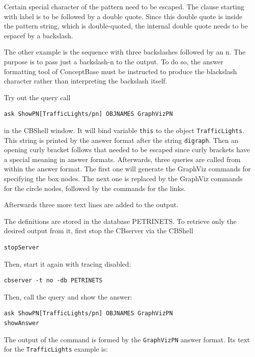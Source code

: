 \documentclass[10pt,a4paper]{article}
\begin{document}
Certain special character of the pattern need to be escaped. The clause starting with label 
is to be followed by a double quote. Since this double quote is inside the pattern string, which
is double-quoted, the internal double quote needs to be espacef by a backslash.

The other example is the sequence with three backslashes followed by an n. The purpose is
to pass just a backslash-n to the output. To do so, the answer formatting tool of ConceptBase
must be instructed to produce the blackslash character rather than interpreting the backslash itself.


Try out the query call

\begin{verbatim}
ask ShowPN[TrafficLights/pn] OBJNAMES GraphVizPN
\end{verbatim}

in the CBShell window. It will bind variable {\tt this} to the object {\tt TrafficLights}.
This string is printed by the answer format after the string {\tt digraph}.
Then an opening curly bracket follows that needed to be escaped
since curly brackets have a special meaning in answer formats.
Afterwards, three queries are called from within the answer format. The first one will
generate the GraphViz commands for specifying the box nodes. The next one is replaced by the
GraphViz commands for the circle nodes, followed by the commands for the links.

Afterwards three more text lines are added to the output.

The definitions are stored in the database PETRINETS. To retrieve only the desired output from
it, first stop the CBserver via the CBShell

\begin{verbatim}
stopServer
\end{verbatim}


Then, start it again with tracing disabled:


\begin{verbatim}
cbserver -t no -db PETRINETS
\end{verbatim}

Then, call the query and show the answer:

\begin{verbatim}
ask ShowPN[TrafficLights/pn] OBJNAMES GraphVizPN
showAnswer
\end{verbatim}

The output of the command is formed by the {\tt GraphVizPN} answer format. Its text for
the {\tt TrafficLights} example is:
\end{document}
